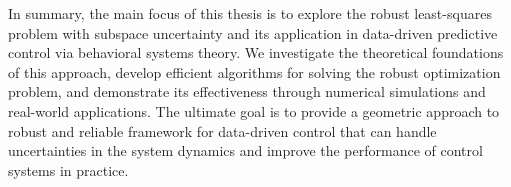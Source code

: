 In summary, the main focus of this thesis is to explore the robust least-squares problem with subspace uncertainty and its application in data-driven predictive control via behavioral systems theory. We investigate the theoretical foundations of this approach, develop efficient algorithms for solving the robust optimization problem, and demonstrate its effectiveness through numerical simulations and real-world applications. The ultimate goal is to provide a geometric approach to robust and reliable framework for data-driven control that can handle uncertainties in the system dynamics and improve the performance of control systems in practice.


